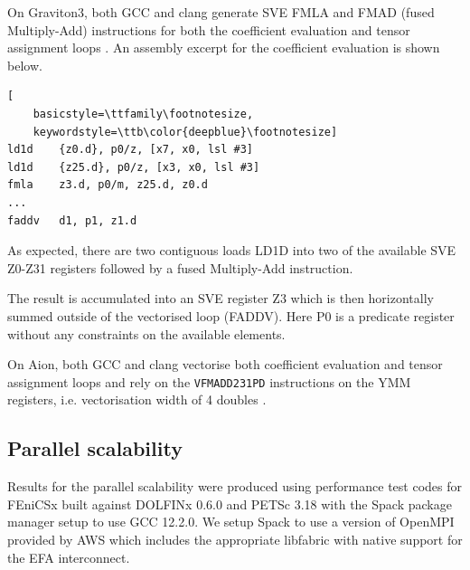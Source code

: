 On Graviton3, both GCC and clang generate SVE FMLA and FMAD (fused
Multiply-Add) instructions \citep{ArmReferenceManual} for both the coefficient
evaluation and tensor assignment loops \citep{GodboltArmClang,GodboltArmGCC}.
An assembly excerpt for the coefficient evaluation is shown below.
\begin{lstlisting}[
    basicstyle=\ttfamily\footnotesize,
    keywordstyle=\ttb\color{deepblue}\footnotesize]
ld1d    {z0.d}, p0/z, [x7, x0, lsl #3]
ld1d    {z25.d}, p0/z, [x3, x0, lsl #3]
fmla    z3.d, p0/m, z25.d, z0.d
...
faddv   d1, p1, z1.d
\end{lstlisting}
As expected, there are two contiguous loads LD1D into two of the available SVE
Z0-Z31 registers followed by a fused Multiply-Add instruction.

The result is accumulated into an SVE register Z3 which is then horizontally
summed outside of the vectorised loop (FADDV). Here P0 is a predicate
register without any constraints on the available elements.

On Aion, both GCC and clang vectorise both coefficient evaluation and tensor
assignment loops and rely on the \lstinline{VFMADD231PD} instructions on the
YMM registers, i.e. vectorisation width of 4 doubles
\citep{Godboltx86Clang,Godboltx86GCC}.


\subsection*{Parallel scalability}

Results for the parallel scalability were produced using performance test codes
for FEniCSx \citep{Wells2023} built against DOLFINx 0.6.0 and PETSc 3.18
\citep{petsc} with the Spack package manager setup to use GCC 12.2.0. We setup
Spack to use a version of OpenMPI provided by AWS which includes the
appropriate libfabric with native support for the EFA interconnect.

